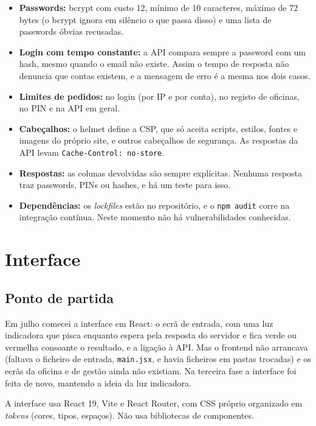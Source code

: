 \documentclass[a4paper,12pt]{article}
\begin{document}
\begin{itemize}
    \item \textbf{Passwords:} bcrypt com custo 12, mínimo de 10 caracteres, máximo de 72 bytes (o bcrypt ignora em silêncio o que passa disso) e uma lista de passwords óbvias recusadas.
    \item \textbf{Login com tempo constante:} a \ac{API} compara sempre a password com um hash, mesmo quando o email não existe. Assim o tempo de resposta não denuncia que contas existem, e a mensagem de erro é a mesma nos dois casos.
    \item \textbf{Limites de pedidos:} no login (por IP e por conta), no registo de oficinas, no PIN e na \ac{API} em geral.
    \item \textbf{Cabeçalhos:} o helmet define a \ac{CSP}, que só aceita scripts, estilos, fontes e imagens do próprio site, e outros cabeçalhos de segurança. As respostas da \ac{API} levam \texttt{Cache-Control: no-store}.
    \item \textbf{Respostas:} as colunas devolvidas são sempre explícitas. Nenhuma resposta traz passwords, PINs ou hashes, e há um teste para isso.
    \item \textbf{Dependências:} os \textit{lockfiles} estão no repositório, e o \texttt{npm audit} corre na integração contínua. Neste momento não há vulnerabilidades conhecidas.
\end{itemize}

\section{Interface}
\label{sec:interface}

\subsection{Ponto de partida}

Em julho comecei a interface em React: o ecrã de entrada, com uma luz indicadora que pisca enquanto espera pela resposta do servidor e fica verde ou vermelha consoante o resultado, e a ligação à \ac{API}. Mas o frontend não arrancava (faltava o ficheiro de entrada, \texttt{main.jsx}, e havia ficheiros em pastas trocadas) e os ecrãs da oficina e de gestão ainda não existiam. Na terceira fase a interface foi feita de novo, mantendo a ideia da luz indicadora.

A interface usa React 19, Vite e React Router, com CSS próprio organizado em \textit{tokens} (cores, tipos, espaços). Não usa bibliotecas de componentes.
\end{document}
